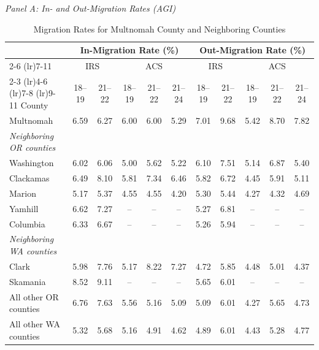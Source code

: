 \begin{table}[htbp]
\centering
\caption{Migration Rates for Multnomah County and Neighboring Counties}
\label{tab:migration_rates}
\begin{threeparttable}
\vspace{0.5em}
\textit{Panel A: In- and Out-Migration Rates (AGI)}
\vspace{0.3em}
{\footnotesize\setlength{\tabcolsep}{3pt}
\begin{tabular}{l*{10}c}
\toprule
 & \multicolumn{5}{c}{In-Migration Rate (\%)} & \multicolumn{5}{c}{Out-Migration Rate (\%)} \\
\cmidrule(lr){2-6} \cmidrule(lr){7-11}
 & \multicolumn{2}{c}{IRS} & \multicolumn{3}{c}{ACS} & \multicolumn{2}{c}{IRS} & \multicolumn{3}{c}{ACS} \\
\cmidrule(lr){2-3} \cmidrule(lr){4-6} \cmidrule(lr){7-8} \cmidrule(lr){9-11}
County & 18--19 & 21--22 & 18--19 & 21--22 & 21--24 & 18--19 & 21--22 & 18--19 & 21--22 & 21--24 \\
\midrule
Multnomah & 6.59 & 6.27 & 6.00 & 6.00 & 5.29 & 7.01 & 9.68 & 5.42 & 8.70 & 7.82 \\
\addlinespace
\textit{Neighboring OR counties} & & & & & & & & & & \\
\quad Washington & 6.02 & 6.06 & 5.00 & 5.62 & 5.22 & 6.10 & 7.51 & 5.14 & 6.87 & 5.40 \\
\quad Clackamas & 6.49 & 8.10 & 5.81 & 7.34 & 6.46 & 5.82 & 6.72 & 4.45 & 5.91 & 5.11 \\
\quad Marion & 5.17 & 5.37 & 4.55 & 4.55 & 4.20 & 5.30 & 5.44 & 4.27 & 4.32 & 4.69 \\
\quad Yamhill & 6.62 & 7.27 & -- & -- & -- & 5.27 & 6.81 & -- & -- & -- \\
\quad Columbia & 6.33 & 6.67 & -- & -- & -- & 5.26 & 5.94 & -- & -- & -- \\
\addlinespace
\textit{Neighboring WA counties} & & & & & & & & & & \\
\quad Clark & 5.98 & 7.76 & 5.17 & 8.22 & 7.27 & 4.72 & 5.85 & 4.48 & 5.01 & 4.37 \\
\quad Skamania & 8.52 & 9.11 & -- & -- & -- & 5.65 & 6.01 & -- & -- & -- \\
\addlinespace
All other OR counties & 6.76 & 7.63 & 5.56 & 5.16 & 5.09 & 5.09 & 6.01 & 4.27 & 5.65 & 4.73 \\
All other WA counties & 5.32 & 5.68 & 5.16 & 4.91 & 4.62 & 4.89 & 6.01 & 4.43 & 5.28 & 4.77 \\

\end{tabular}}
\end{threeparttable}
\end{table}
